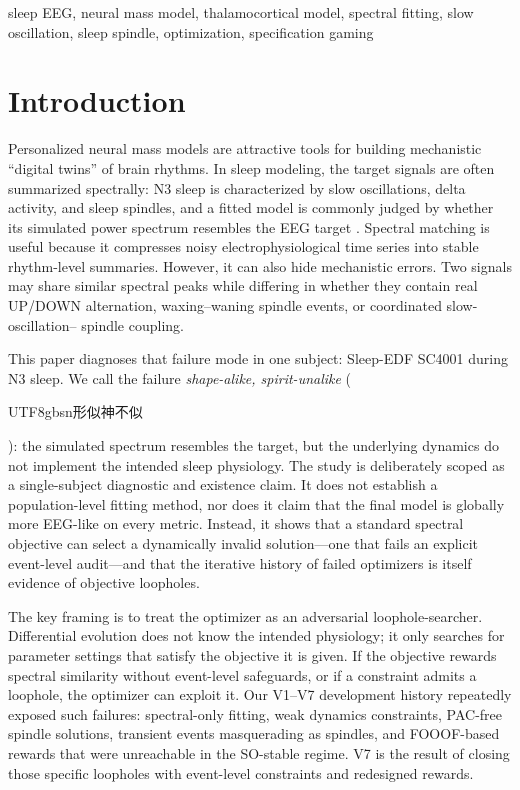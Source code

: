 \documentclass[conference]{IEEEtran}
\begin{document}
\begin{IEEEkeywords}
sleep EEG, neural mass model, thalamocortical model, spectral fitting, slow
oscillation, sleep spindle, optimization, specification gaming
\end{IEEEkeywords}

\section{Introduction}
Personalized neural mass models are attractive tools for building mechanistic
``digital twins'' of brain rhythms. In sleep modeling, the target signals are
often summarized spectrally: N3 sleep is characterized by slow oscillations,
delta activity, and sleep spindles, and a fitted model is commonly judged by
whether its simulated power spectrum resembles the EEG target
\cite{cakan2023,jajcay2022,sleepedf}. Spectral matching is useful because it
compresses noisy electrophysiological time series into stable rhythm-level
summaries. However, it can also hide mechanistic errors. Two signals may share
similar spectral peaks while differing in whether they contain real UP/DOWN
alternation, waxing--waning spindle events, or coordinated slow-oscillation--
spindle coupling.

This paper diagnoses that failure mode in one subject: Sleep-EDF SC4001 during
N3 sleep. We call the failure \emph{shape-alike, spirit-unalike}
(\begin{CJK}{UTF8}{gbsn}形似神不似\end{CJK}): the simulated spectrum resembles
the target, but the underlying dynamics do not implement the intended sleep
physiology. The study is deliberately scoped as a single-subject diagnostic and
existence claim. It does not establish a population-level fitting method, nor
does it claim that the final model is globally more EEG-like on every metric.
Instead, it shows that a standard spectral objective can select a dynamically
invalid solution---one that fails an explicit event-level audit---and that the
iterative history of failed optimizers is itself evidence of objective
loopholes.

The key framing is to treat the optimizer as an adversarial loophole-searcher.
Differential evolution does not know the intended physiology; it only searches
for parameter settings that satisfy the objective it is given. If the objective
rewards spectral similarity without event-level safeguards, or if a constraint
admits a loophole, the optimizer can exploit it. Our V1--V7 development history
repeatedly exposed such failures: spectral-only fitting, weak dynamics
constraints, PAC-free spindle solutions, transient events masquerading as
spindles, and FOOOF-based rewards that were unreachable in the SO-stable
regime. V7 is the result of closing those specific loopholes with event-level
constraints and redesigned rewards.
\end{document}
